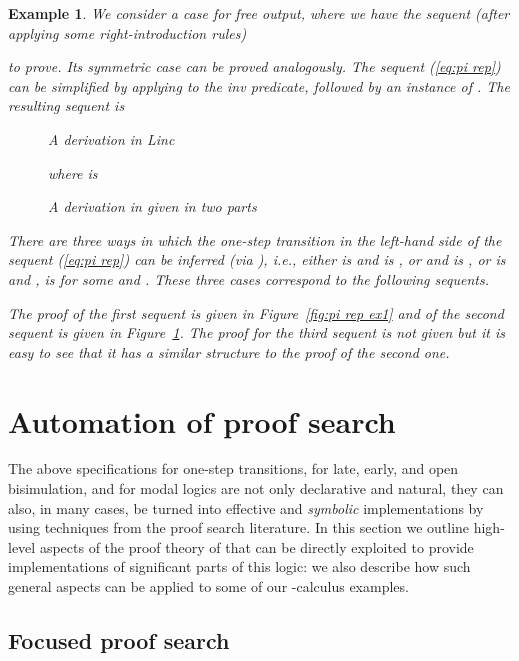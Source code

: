 \documentclass{acmtrans2m}
\newenvironment{example}{\begin{exa} \rm}{\end{exa}}
\newtheorem{exa}[theorem]{Example}
\begin{document}
\begin{example}
We consider a case for free output, where we have the sequent (after applying
some right-introduction rules)

to prove. 
Its symmetric case can be proved analogously. 
The sequent (\ref{eq:pi rep}) can be simplified by applying
 to the {\sl inv} predicate, 
followed by an instance of . The resulting sequent is


\begin{figure}

\caption{A derivation in Linc}
\label{fig:pi rep ex1}

where  is

\caption{A derivation in  given in two parts}
\label{fig:pi rep ex2}
\end{figure}

There are three ways in which the one-step transition
in the left-hand side of the sequent (\ref{eq:pi rep}) can be inferred 
(via ), 
{\em i.e.}, either  is  and  is , or
 and  is , or  is  and 
,  is 
for some  and . These three cases correspond to the following sequents.

The proof of the first sequent is given in Figure~\ref{fig:pi rep ex1} and of the
second sequent is given in Figure~\ref{fig:pi rep ex2}. 
The proof for the third sequent is not given but it is easy to see that
it has a similar structure to the proof of the second one.
\end{example}


\section{Automation of proof search}
\label{sec:auto}

The above specifications for one-step transitions, for late, early,
and open bisimulation, and for modal logics are not only declarative
and natural, they can also, in many cases, be turned into effective and
{\em symbolic} implementations by using techniques from the proof
search literature.  In this section we outline high-level aspects of
the proof theory of  that can be directly exploited to
provide implementations of significant parts of this logic: we also
describe how such general aspects can be applied to some of our
-calculus examples.

\subsection{Focused proof search}
\end{document}
